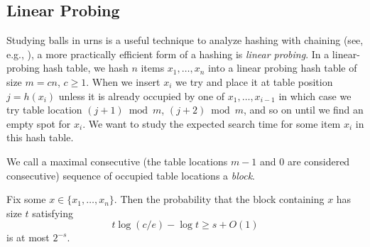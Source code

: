 \documentclass{patmorin}
\begin{document}
\subsection{Linear Probing}

Studying balls in urns is a useful technique to analyze hashing with
chaining (see, e.g., \cite[Section~5.1]{morin:open}), a more practically
efficient form of a hashing is \emph{linear probing}.  In a linear-probing
hash table, we hash $n$ items $x_1,\ldots,x_n$ into a linear probing hash
table of size $m=cn$, $c\ge 1$. When we insert $x_i$ we try and place
it at table position $j=h(x_i)$ unless it is already occupied by one of
$x_1,\ldots,x_{i-1}$ in which case we try table location $(j+1)\bmod m$,
$(j+2)\bmod m$, and so on until we find an empty spot for $x_i$.  We want
to study the expected search time for some item $x_i$ in this hash table.

We call a maximal consecutive (the table locations $m-1$ and
$0$ are considered consecutive) sequence of occupied table locations
a \emph{block}.

\begin{thm}
  Fix some $x\in\{x_1,\ldots,x_n\}$. Then the probability that the
  block containing $x$ has size $t$ satisfying
  \[t \log (c/e) - \log t \ge s + O(1)\]
  is at most $2^{-s}$.
\end{thm}
\end{document}

